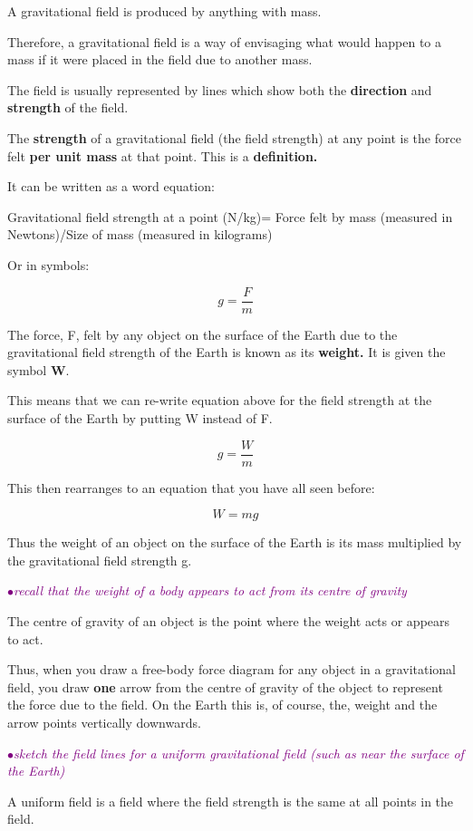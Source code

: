 \documentclass[a4paper,11pt,twoside]{memoir}
\newcounter{spec}[chapter]
\newcommand{\spec}[1]{\Needspace{5\baselineskip}\textcolor{purple}{$\bullet$\hspace{0.5cm}\textit{#1}}}
\begin{document}
A gravitational field is produced by anything with mass.

Therefore, a gravitational field is a way of envisaging what would
happen to a mass if it were placed in the field due to another mass.

The field is usually represented by lines which show both the
\textbf{direction} and \textbf{strength} of the field.

The \textbf{strength} of a gravitational field (the field strength) at
any point is the force felt \textbf{per unit mass} at that point. This
is a \textbf{definition.}

It can be written as a word equation:

Gravitational field strength at a point (N/kg)= Force felt by mass (measured
in Newtons)/Size of mass (measured in kilograms)

Or in symbols:

\[g = \frac{F}{m} \]

The force, F, felt by any object on the surface of the Earth due to the
gravitational field strength of the Earth is known as its
\textbf{weight.} It is given the symbol \textbf{W}.

This means that we can re-write equation above for the field strength at
the surface of the Earth by putting W instead of F.

\[g = \frac{W}{m}\]

This then rearranges to an equation that you have all seen before:

\[W = mg\]

Thus the weight of an object on the surface of the Earth is its mass
multiplied by the gravitational field strength g.

\spec{recall that the weight of a body appears to act from its centre of gravity}

The centre of gravity of an object is the point where the weight acts or
appears to act.

Thus, when you draw a free-body force diagram for any object in a
gravitational field, you draw \textbf{one} arrow from the centre of
gravity of the object to represent the force due to the field. On the
Earth this is, of course, the, weight and the arrow points vertically
downwards.

\spec{sketch the field lines for a uniform gravitational field (such as near the surface of the Earth)}

A uniform field is a field where the field strength is the same at all
points in the field.
\end{document}
